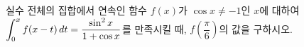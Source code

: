 실수 전체의 집합에서 연속인 함수 $f(x)$가 $\cos x\ne -1$인 $x$에 대하여 $\displaystyle\int_{0}^{x}f(x-t)\mkern3mu dt=\dfrac{\sin^2 x}{1+\cos x}$를 만족시킬 때, $f\!\left(\dfrac{\pi}{6}\right)$의 값을 구하시오.
